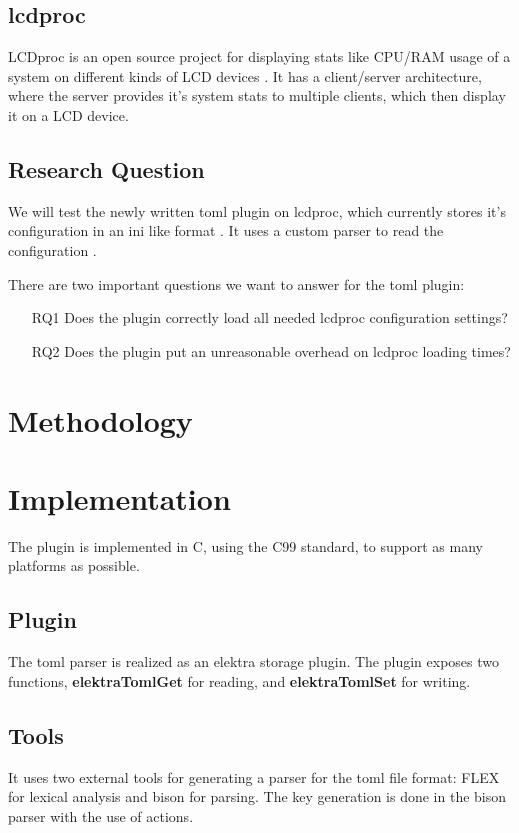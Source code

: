 \documentclass[12pt]{report}
\begin{document}
\section{lcdproc}
LCDproc is an open source project for displaying stats like CPU/RAM usage of a system on different kinds of LCD devices \cite{lcdprocmain}\cite{lcdprocgit}.
It has a client/server architecture, where the server provides it's system stats to multiple clients, which then display it on a LCD device.

\section{Research Question}
We will test the newly written toml plugin on lcdproc, which currently stores it's configuration in an ini like format \cite{lcdprocconf}.
It uses a custom parser to read the configuration \cite{lcdprocconfigreader}.

There are two important questions we want to answer for the toml plugin:
\begin{itemize}
	\item[RQ1] Does the plugin correctly load all needed lcdproc configuration settings?
	\item[RQ2] Does the plugin put an unreasonable overhead on lcdproc loading times?
\end{itemize}

\chapter*{Methodology}

\chapter*{Implementation}

The plugin is implemented in C, using the C99 standard, to support as many platforms as possible.

\section{Plugin}
The toml parser is realized as an elektra storage plugin. The plugin exposes two functions, \textbf{elektraTomlGet} for reading, and \textbf{elektraTomlSet} for writing.

\section{Tools}
It uses two external tools for generating a parser for the toml file format: \acrshort{FLEX} \cite{flexgit} for lexical analysis and bison \cite{bisonmain} for parsing.
The key generation is done in the bison parser with the use of actions.
\end{document}

